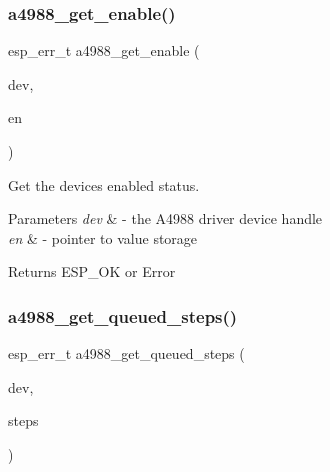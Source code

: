 \subsubsection{\texorpdfstring{a4988\+\_\+get\+\_\+enable()}{a4988\_get\_enable()}}
{\footnotesize\ttfamily esp\+\_\+err\+\_\+t a4988\+\_\+get\+\_\+enable (\begin{DoxyParamCaption}\item[{\hyperlink{group__A4988__definitions_ga16590a9dd79ad8fcf4c317be2659b6c5}{A4988\+\_\+\+D\+EV}}]{dev,  }\item[{bool $\ast$}]{en }\end{DoxyParamCaption})}



Get the device\textquotesingle{}s enabled status. 


\begin{DoxyParams}{Parameters}
{\em dev} & -\/ the A4988 driver device handle \\
\hline
{\em en} & -\/ pointer to value storage \\
\hline
\end{DoxyParams}
\begin{DoxyReturn}{Returns}
E\+S\+P\+\_\+\+OK or Error 
\end{DoxyReturn}
\mbox{\label{group__A4988__Driver__functions_ga144d15a11c15f6404e03850da79f51b9}} 
\subsubsection{\texorpdfstring{a4988\+\_\+get\+\_\+queued\+\_\+steps()}{a4988\_get\_queued\_steps()}}
{\footnotesize\ttfamily esp\+\_\+err\+\_\+t a4988\+\_\+get\+\_\+queued\+\_\+steps (\begin{DoxyParamCaption}\item[{\hyperlink{group__A4988__definitions_ga16590a9dd79ad8fcf4c317be2659b6c5}{A4988\+\_\+\+D\+EV}}]{dev,  }\item[{\hyperlink{vl53l0x__types_8h_a273cf69d639a59973b6019625df33e30}{uint16\+\_\+t} $\ast$}]{steps }\end{DoxyParamCaption})}



